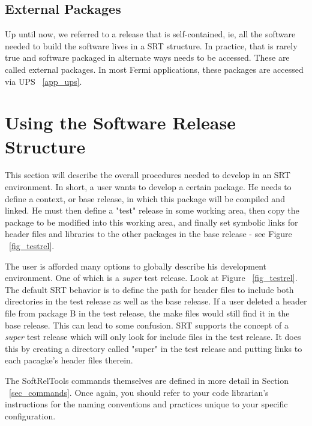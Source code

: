 \documentclass[12pt]{article}
\begin{document}
\subsection{External Packages}

Up until now, we referred to a release that is self-contained, ie, all the
software needed to build the software lives in a SRT structure. In practice,
that is rarely true and software packaged in alternate ways needs to be
accessed. These are called external packages. In most Fermi applications,
these packages are accessed via UPS ~\ref{app_ups}.
%
%

\section{Using the Software Release Structure}
\label{sec_examples}

This section will describe the overall procedures needed to develop
in an SRT environment.  In short, a user wants to develop a certain
package. He needs to define a context, or base release, in which this 
package will be compiled and linked. He must then define a "test" release
in some working area, then copy the package to be modified
into this working area, and finally set symbolic links for header files
and libraries to the other packages in the base release - see Figure ~\ref{fig_testrel}.  

The user is afforded many options to globally describe his development 
environment. One of which is a {\em super} test release. 
Look at Figure ~\ref{fig_testrel}. The default SRT behavior is to define
the path for header files to include both directories in the test 
release as well as the base release. If a user deleted a header file from 
package B in the test release, the make files would still find it in the
base release. This can lead to some confusion. SRT supports the concept
of a {\em super} test release which will only look for include files in the
test release.  It does this by creating a directory called 
"super" in the
test release and putting links to each pacagke's header files therein. 


The SoftRelTools commands themselves are defined in more
detail in Section ~\ref{sec_commands}. 
Once again, you should
refer to your code librarian's instructions for the naming conventions and
practices unique to your specific configuration. 
\end{document}
